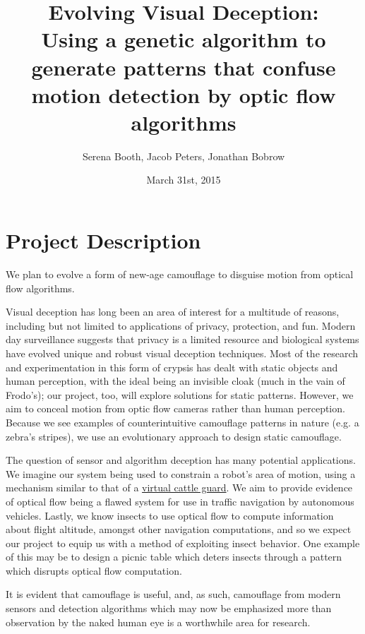 \documentclass[12pt,letter]{article}
\begin{document}
\title{Evolving Visual Deception: \\ \large Using a genetic algorithm to generate patterns that confuse motion detection by optic flow algorithms}

\author{Serena Booth, Jacob Peters, Jonathan Bobrow}

\date{March 31st, 2015}
 
\maketitle 
 
\section{Project Description}
We plan to evolve a form of new-age camouflage to disguise motion from optical flow algorithms. 

Visual deception has long been an area of interest for a multitude of reasons, including but not limited to applications of privacy, protection, and fun. Modern day surveillance suggests that privacy is a limited resource and biological systems have evolved unique and robust visual deception techniques. Most of the research and experimentation in this form of crypsis has dealt with static objects and human perception, with the ideal being an invisible cloak (much in the vain of Frodo's); our project, too, will explore solutions for static patterns. However, we aim to conceal motion from optic flow cameras rather than human perception. Because we see examples of counterintuitive camouflage patterns in nature (e.g. a zebra's stripes), we use an evolutionary approach to design static camouflage. 

The question of sensor and algorithm deception has many potential applications. We imagine our system being used to constrain a robot’s area of motion, using a mechanism similar to that of a \href{http://upload.wikimedia.org/wikipedia/commons/6/6b/Lone_Pine,_CA_Virtual_Cattle_Guard.jpg}{virtual cattle guard}. We aim to provide evidence of optical flow being a flawed system for use in traffic navigation by autonomous vehicles. Lastly, we know insects to use optical flow to compute information about flight altitude, amongst other navigation computations, and so we expect our project to equip us with a method of exploiting insect behavior. One example of this may be to design a picnic table which deters insects through a pattern which disrupts optical flow computation.

It is evident that camouflage is useful, and, as such, camouflage from modern sensors and detection algorithms which may now be emphasized more than observation by the naked human eye is a worthwhile area for research. 
\end{document}
